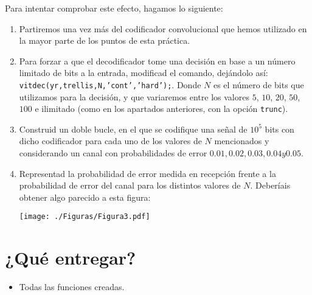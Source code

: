 \documentclass[es,practica]{uah}
\begin{document}
Para intentar comprobar este efecto, hagamos lo siguiente:

\begin{enumerate}
\item Partiremos una vez más del codificador convolucional que hemos utilizado en la mayor parte de los puntos de esta práctica. 
\item Para forzar a que el decodificador tome una decisión en base a un número limitado de bits a la entrada, modificad el comando, dejándolo así: \texttt{vitdec(yr,trellis,N,'cont','hard');}. Donde $N$ es el número de bits que utilizamos para la decisión, y que variaremos entre los valores $5$, $10$, $20$, $50$, $100$ e ilimitado (como en los apartados anteriores, con la opción \texttt{trunc}).
\item Construid un doble bucle, en el que se codifique una señal de $10^5$ bits con dicho codificador para cada uno de los valores de $N$ mencionados y considerando un canal con probabilidades de error $0.01, 0.02, 0.03, 0.04 y 0.05$. 
\item Representad la probabilidad de error medida en recepción frente a la probabilidad de error del canal para los distintos valores de $N$. Deberíais obtener algo parecido a esta figura:

\centering\texttt{[image: ./Figuras/Figura3.pdf]}
\end{enumerate}

\section{¿Qué entregar?}
\begin{itemize}
	\item Todas las funciones creadas.
\end{itemize}


\end{document}
